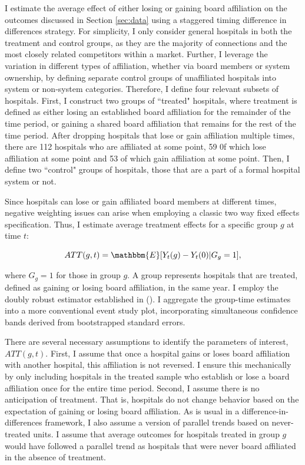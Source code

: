\documentclass[12pt]{article}
\begin{document}
    I estimate the average effect of either losing or gaining board affiliation on the outcomes discussed in Section \ref{sec:data} using a staggered timing difference in differences strategy. For simplicity, I only consider general hospitals in both the treatment and control groups, as they are the majority of connections and the most closely related competitors within a market. Further, I leverage the variation in different types of affiliation, whether via board members or system ownership, by defining separate control groups of unaffiliated hospitals into system or non-system categories. Therefore, I define four relevant subsets of hospitals. First, I construct two groups of ``treated" hospitals, where treatment is defined as either losing an established board affiliation for the remainder of the time period, or gaining a shared board affiliation that remains for the rest of the time period. After dropping hospitals that lose or gain affiliation multiple times, there are 112 hospitals who are affiliated at some point, 59 0f which lose affiliation at some point and 53 of which gain affiliation at some point. Then, I define two ``control" groups of hospitals, those that are a part of a formal hospital system or not. 

    Since hospitals can lose or gain affiliated board members at different times, negative weighting issues can arise when employing a classic two way fixed effects specification. Thus, I estimate average treatment effects for a specific group $g$ at time $t$:
    
    $$ATT(g,t)=\mathbbm{E}[Y_t(g)-Y_t(0)|G_g=1],$$
    
    \noindent where $G_g=1$ for those in group $g$. A group represents hospitals that are treated, defined as gaining or losing board affiliation, in the same year. I employ the doubly robust estimator established in \citeauthor{sant2020doubly} (\citeyear{sant2020doubly}). I aggregate the group-time estimates into a more conventional event study plot, incorporating simultaneous confidence bands derived from bootstrapped standard errors. 

    There are several necessary assumptions to identify the parameters of interest, $ATT(g,t)$. First, I assume that once a hospital gains or loses board affiliation with another hospital, this affiliation is not reversed. I ensure this mechanically by only including hospitals in the treated sample who establish or lose a board affiliation once for the entire time period. Second, I assume there is no anticipation of treatment. That is, hospitals do not change behavior based on the expectation of gaining or losing board affiliation. As is usual in a difference-in-differences framework, I also assume a version of parallel trends based on never-treated units. I assume that average outcomes for hospitals treated in group $g$ would have followed a parallel trend as hospitals that were never board affiliated in the absence of treatment. 
\end{document}
